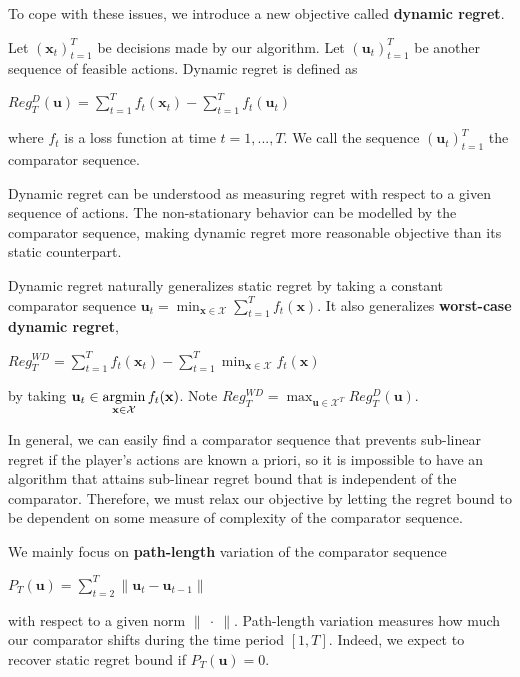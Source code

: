 \documentclass[12pt, a4paper]{report}
\begin{document}
To cope with these issues, we introduce a new objective called \textbf{dynamic regret}.
\begin{defn}
Let $(\mathbf{x}_t)_{t=1}^{T}$ be decisions made by our algorithm. Let $(\mathbf{u}_t)_{t=1}^{T}$ be another sequence of feasible actions. Dynamic regret is defined as
\begin{center}
    $\displaystyle Reg_{T}^{D}(\mathbf{u}) = \sum_{t=1}^{T}f_t(\mathbf{x}_t) - \sum_{t=1}^{T}f_t(\mathbf{u}_t)$
\end{center}
where $f_t$ is a loss function at time $t=1, ..., T$. We call the sequence  $(\mathbf{u}_t)_{t=1}^T$ the comparator sequence.
\end{defn}
Dynamic regret can be understood as measuring regret with respect to a given sequence of actions. The non-stationary behavior can be modelled by the comparator sequence, making dynamic regret more reasonable objective than its static counterpart. 

Dynamic regret naturally generalizes static regret by taking a constant comparator sequence $\displaystyle \mathbf{u}_t = \min_{\mathbf{x} \in \mathcal{X}} \sum_{t=1}^{T} f_t(\mathbf{x})$. It also generalizes \textbf{worst-case dynamic regret},
\begin{center}
    $\displaystyle Reg_{T}^{WD} = \sum_{t=1}^{T} f_t(\mathbf{x}_t) - \sum_{t=1}^{T} \min_{\mathbf{x} \in \mathcal{X}} f_t(\mathbf{x})$
\end{center}
by taking $\displaystyle \mathbf{u}_t \in \operatorname*{argmin}_{\mathbf{x} \in \mathcal{X}} f_t(\mathbf{x})$. Note $\displaystyle Reg_T^{WD} = \max_{\mathbf{u}\in \mathcal{X}^T} Reg_T^D(\mathbf{u})$. 

In general, we can easily find a comparator sequence that prevents sub-linear regret if the player's actions are known a priori, so it is impossible to have an algorithm that attains sub-linear regret bound that is independent of the comparator.
Therefore, we must relax our objective by letting the regret bound to be dependent on some measure of complexity of the comparator sequence. 

We mainly focus on \textbf{path-length} variation of the comparator sequence
\begin{center}
    $\displaystyle P_T(\mathbf{u}) = \sum_{t=2}^{T} \lVert \mathbf{u}_t - \mathbf{u}_{t-1} \rVert$
\end{center}
with respect to a given norm $\lVert\ \cdot\ \rVert$. Path-length variation measures how much our comparator shifts during the time period $[1, T]$. Indeed, we expect to recover static regret bound if $P_T(\mathbf{u}) = 0$. 
\end{document}
